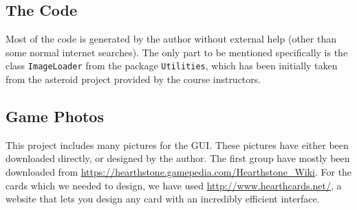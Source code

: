 \documentclass[a4paper]{article}
\begin{document}
\subsection{The Code}
Most of the code is generated by the author without external help (other than some normal internet searches). The only part to be mentioned specifically is the class \texttt{ImageLoader} from the package \texttt{Utilities}, which has been initially taken from the asteroid project provided by the course instructors.

\subsection{Game Photos}
This project includes many pictures for the GUI. These pictures have either been downloaded directly, or designed by the author. The first group have mostly been downloaded from \url{https://hearthstone.gamepedia.com/Hearthstone_Wiki}. For the cards which we needed to design, we have used \url{http://www.hearthcards.net/}, a website that lets you design any card with an incredibly efficient interface.
\end{document}

